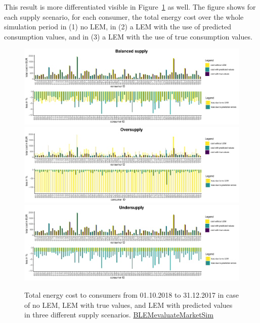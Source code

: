 This result is more differentiated visible in Figure~\ref{Fig:total_energycost} as well. The figure shows for each supply scenario, for each consumer, the total energy cost over the whole simulation period in (1) no LEM, in (2) a LEM with the use of predicted consumption values, and in (3) a LEM with the use of true consumption values.
%
\begin{figure}[htbp]
    \centering
    \includegraphics[width=\textwidth]{thesis/graphs/marketsimulation/totalenergycost_balanced.pdf}\\\vspace{.6cm}
    \includegraphics[width=\textwidth]{thesis/graphs/marketsimulation/totalenergycost_oversupply.pdf}\\\vspace{.6cm}
    \includegraphics[width=\textwidth]{thesis/graphs/marketsimulation/totalenergycost_undersupply.pdf}
    \caption[Total energy cost to consumers in different supply scenarios]{Total energy cost to consumers from 01.10.2018 to 31.12.2017 in case of no LEM, LEM with true values, and LEM with predicted values in three different supply scenarios. \quantnet\href{https://github.com/QuantLet/BLEM/tree/master/BLEMevaluateMarketSim}{BLEMevaluateMarketSim}}
    \label{Fig:total_energycost}
\end{figure}
%

